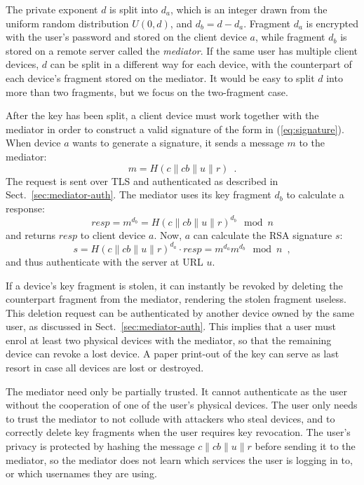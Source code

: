 \documentclass{llncs}
\newcommand*{\concat}{\mathbin{\|}}
\begin{document}
The private exponent $d$ is split into $d_a$, which is an integer drawn from the uniform random
distribution $U(0, d)$, and $d_b = d - d_a$. Fragment $d_a$ is encrypted with the user's password
and stored on the client device $a$, while fragment $d_b$ is stored on a remote server called the
\emph{mediator}. If the same user has multiple client devices, $d$ can be split in a different way
for each device, with the counterpart of each device's fragment stored on the mediator. It would be
easy to split $d$ into more than two fragments, but we focus on the two-fragment case.

After the key has been split, a client device must work together with the mediator in order to
construct a valid signature of the form in (\ref{eq:signature}). When device $a$ wants to generate a
signature, it sends a message $m$ to the mediator:
\begin{equation}\label{eq:mediator-req}
m = H(c \concat \mathit{cb} \concat u \concat r) \enspace.
\end{equation}
The request is sent over TLS and authenticated as described in Sect.~\ref{sec:mediator-auth}. The
mediator uses its key fragment $d_b$ to calculate a response:
\begin{equation}\label{eq:mediator-resp}
\mathit{resp} = m^{d_b} = H(c \concat \mathit{cb} \concat u \concat r)^{d_b} \mod n
\end{equation}
and returns $\mathit{resp}$ to client device $a$. Now, $a$ can calculate the RSA signature $s$:
\begin{equation}\label{eq:assemble-sig}
s = H(c \concat \mathit{cb} \concat u \concat r)^{d_a} \cdot \mathit{resp} = m^{d_a} m^{d_b} \mod n \enspace,
\end{equation}
and thus authenticate with the server at URL $u$.

If a device's key fragment is stolen, it can instantly be revoked by deleting the counterpart
fragment from the mediator, rendering the stolen fragment useless. This deletion request can be
authenticated by another device owned by the same user, as discussed in
Sect.~\ref{sec:mediator-auth}. This implies that a user must enrol at least two physical devices
with the mediator, so that the remaining device can revoke a lost device. A paper print-out of the
key can serve as last resort in case all devices are lost or destroyed.

The mediator need only be partially trusted. It cannot authenticate as the user without the
cooperation of one of the user's physical devices. The user only needs to trust the mediator to not
collude with attackers who steal devices, and to correctly delete key fragments when the user
requires key revocation. The user's privacy is protected by hashing the message
$c \concat \mathit{cb} \concat u \concat r$ before sending it to the mediator, so the mediator does not learn which
services the user is logging in to, or which usernames they are using.
\end{document}
